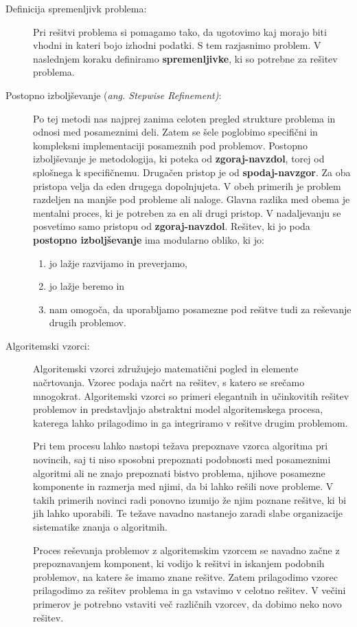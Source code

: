 \begin{description}
\item [Definicija spremenljivk problema:] Pri rešitvi problema
  si pomagamo tako, da ugotovimo kaj morajo biti vhodni in kateri bojo
  izhodni podatki. S tem razjasnimo problem. V naslednjem koraku
  definiramo \textbf{spremenljivke}, ki so potrebne za rešitev
  problema.
\item [Postopno izboljševanje (\emph{ang. Stepwise
      Refinement)}:]Po tej metodi nas najprej zanima celoten pregled
  strukture problema in odnosi med posameznimi deli. Zatem se šele
  poglobimo specifični in kompleksni implementaciji posameznih pod
  problemov. Postopno izboljševanje je metodologija, ki poteka od
  \textbf{zgoraj-navzdol}, torej od splošnega k specifičnemu. Drugačen
  pristop je od \textbf{spodaj-navzgor}. Za oba pristopa velja da eden
  drugega dopolnjujeta. V obeh primerih je problem razdeljen na manjše
  pod probleme ali naloge. Glavna razlika med obema je mentalni
  proces, ki je potreben za en ali drugi pristop.  V nadaljevanju se
  posvetimo samo pristopu od \textbf{zgoraj-navzdol}. Rešitev, ki jo
  poda \textbf{postopno izboljševanje} ima modularno obliko, ki jo:
  \begin{enumerate}
  \item jo lažje razvijamo in preverjamo,
  \item jo lažje beremo in
  \item nam omogoča, da uporabljamo posamezne pod rešitve tudi za
    reševanje drugih problemov.
  \end{enumerate}
\item [Algoritemski vzorci:] Algoritemski vzorci združujejo
  matematični pogled in elemente načrtovanja. Vzorec podaja načrt na
  rešitev, s katero se srečamo mnogokrat. Algoritemski vzorci so
  primeri elegantnih in učinkovitih rešitev problemov in predstavljajo
  abstraktni model algoritemskega procesa, katerega lahko prilagodimo
  in ga integriramo v rešitve drugim problemom.

  Pri tem procesu lahko nastopi težava prepoznave vzorca algoritma pri
  novincih, saj ti niso sposobni prepoznati podobnosti med posameznimi
  algoritmi ali ne znajo prepoznati bistvo problema, njihove posamezne
  komponente in razmerja med njimi, da bi lahko rešili nove
  probleme. V takih primerih novinci radi ponovno izumijo že njim
  poznane rešitve, ki bi jih lahko uporabili. Te težave navadno
  nastanejo zaradi slabe organizacije sistematike znanja o algoritmih.

  Proces reševanja problemov z algoritemskim vzorcem se navadno začne
  z prepoznavanjem komponent, ki vodijo k rešitvi in iskanjem podobnih
  problemov, na katere še imamo znane rešitve. Zatem prilagodimo
  vzorec prilagodimo za rešitev problema in ga vstavimo v celotno
  rešitev. V večini primerov je potrebno vstaviti več različnih
  vzorcev, da dobimo neko novo rešitev.
\end{description}

